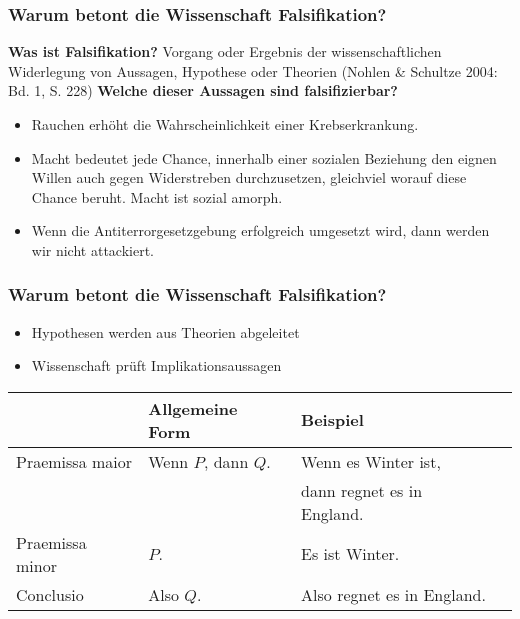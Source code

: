 \documentclass{beamer}
\begin{document}
\begin{frame}
  \frametitle{Warum betont die Wissenschaft Falsifikation?}
  \textbf{Was ist Falsifikation?}\newline
  {\glqq}Vorgang oder Ergebnis der wissenschaftlichen Widerlegung
  von Aussagen, Hypothese oder Theorien{\grqq} (Nohlen \& Schultze 2004: Bd. 1, S. 228)
  \vfill
  \textbf{Welche dieser Aussagen sind falsifizierbar?}
  \begin{itemize}
    \item Rauchen erhöht die Wahrscheinlichkeit einer Krebserkrankung.
    \item Macht bedeutet jede Chance, innerhalb einer
      sozialen Beziehung den eignen Willen auch gegen
      Widerstreben durchzusetzen, gleichviel worauf diese
      Chance beruht. Macht ist sozial amorph.
    \item Wenn die Antiterrorgesetzgebung erfolgreich
      umgesetzt wird, dann werden wir nicht attackiert.
  \end{itemize}
\end{frame}

\begin{frame}
  \frametitle{Warum betont die Wissenschaft Falsifikation?}
  \begin{itemize}
    \item Hypothesen werden aus Theorien abgeleitet
    \item Wissenschaft prüft Implikationsaussagen
  \end{itemize}
  \begin{tabular}{*{4}{l}}
    ~ & Allgemeine Form & Beispiel \\ \hline
    Praemissa maior & Wenn $P$, dann $Q$. & Wenn es Winter ist, \\
    & &  dann regnet es in England.\\
    Praemissa minor & $P$. & Es ist Winter. \\ \hline
    Conclusio & Also $Q$. & Also regnet es in England. \\
  \end{tabular}
\end{frame}


\end{document}

